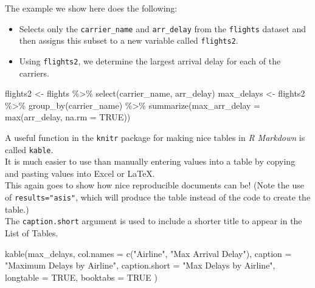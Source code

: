\documentclass[12pt,oneside]{tisemthesis}
\newenvironment{Shaded}{\begin{snugshade}}{\end{snugshade}}
\newcommand{\AttributeTok}[1]{\textcolor[rgb]{0.77,0.63,0.00}{#1}}
\newcommand{\ConstantTok}[1]{\textcolor[rgb]{0.00,0.00,0.00}{#1}}
\newcommand{\FunctionTok}[1]{\textcolor[rgb]{0.00,0.00,0.00}{#1}}
\newcommand{\NormalTok}[1]{#1}
\newcommand{\OtherTok}[1]{\textcolor[rgb]{0.56,0.35,0.01}{#1}}
\newcommand{\SpecialCharTok}[1]{\textcolor[rgb]{0.00,0.00,0.00}{#1}}
\newcommand{\StringTok}[1]{\textcolor[rgb]{0.31,0.60,0.02}{#1}}
\begin{document}
The example we show here does the following:
\begin{itemize}
\item
  Selects only the \texttt{carrier\_name} and \texttt{arr\_delay} from the \texttt{flights} dataset and then assigns this subset to a new variable called \texttt{flights2}.
\item
  Using \texttt{flights2}, we determine the largest arrival delay for each of the carriers.
\end{itemize}
\begin{Shaded}
\begin{Highlighting}[]
\NormalTok{flights2 }\OtherTok{\textless{}{-}}\NormalTok{ flights }\SpecialCharTok{\%\textgreater{}\%}
  \FunctionTok{select}\NormalTok{(carrier\_name, arr\_delay)}
\NormalTok{max\_delays }\OtherTok{\textless{}{-}}\NormalTok{ flights2 }\SpecialCharTok{\%\textgreater{}\%}
  \FunctionTok{group\_by}\NormalTok{(carrier\_name) }\SpecialCharTok{\%\textgreater{}\%}
  \FunctionTok{summarize}\NormalTok{(}\AttributeTok{max\_arr\_delay =} \FunctionTok{max}\NormalTok{(arr\_delay, }\AttributeTok{na.rm =} \ConstantTok{TRUE}\NormalTok{))}
\end{Highlighting}
\end{Shaded}
A useful function in the \texttt{knitr} package for making nice tables in \emph{R Markdown} is called \texttt{kable}.\\
It is much easier to use than manually entering values into a table by copying and pasting values into Excel or LaTeX.\\
This again goes to show how nice reproducible documents can be! (Note the use of \texttt{results="asis"}, which will produce the table instead of the code to create the table.)\\
The \texttt{caption.short} argument is used to include a shorter title to appear in the List of Tables.
\begin{Shaded}
\begin{Highlighting}[]
\FunctionTok{kable}\NormalTok{(max\_delays,}
  \AttributeTok{col.names =} \FunctionTok{c}\NormalTok{(}\StringTok{"Airline"}\NormalTok{, }\StringTok{"Max Arrival Delay"}\NormalTok{),}
  \AttributeTok{caption =} \StringTok{"Maximum Delays by Airline"}\NormalTok{,}
  \AttributeTok{caption.short =} \StringTok{"Max Delays by Airline"}\NormalTok{,}
  \AttributeTok{longtable =} \ConstantTok{TRUE}\NormalTok{,}
  \AttributeTok{booktabs =} \ConstantTok{TRUE}
\NormalTok{)}
\end{Highlighting}
\end{Shaded}
\end{document}
